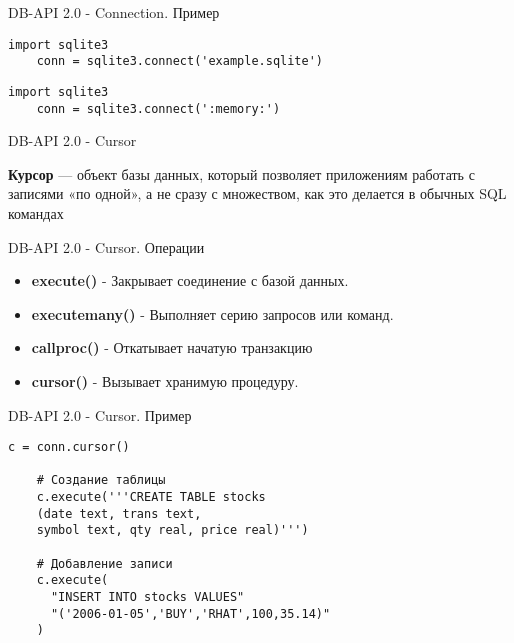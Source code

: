 \begin{frame}[fragile]{DB-API 2.0 - Connection. Пример}

    \begin{lstlisting}[style=python]
    import sqlite3
    conn = sqlite3.connect('example.sqlite')
    \end{lstlisting}

    \begin{lstlisting}[style=python]
    import sqlite3
    conn = sqlite3.connect(':memory:')
    \end{lstlisting}

\end{frame}

\begin{frame}{DB-API 2.0 - Cursor}

  \textbf{Курсор} — объект базы данных, который позволяет приложениям работать
  с записями «по одной», а не сразу с множеством, как это делается в обычных
  SQL командах

\end{frame}

\begin{frame}{DB-API 2.0 - Cursor. Операции}

  \begin{itemize}

    \item \textbf{execute()} - Закрывает соединение с базой данных.
    \item \textbf{executemany()} - Выполняет серию запросов или команд.
    \item \textbf{callproc()} - Откатывает начатую транзакцию
    \item \textbf{cursor()} - Вызывает хранимую процедуру.

  \end{itemize}

\end{frame}

\begin{frame}[fragile]{DB-API 2.0 - Cursor. Пример}

    \begin{lstlisting}[style=python]
    c = conn.cursor()

    # Создание таблицы
    c.execute('''CREATE TABLE stocks
    (date text, trans text,
    symbol text, qty real, price real)''')

    # Добавление записи
    c.execute(
      "INSERT INTO stocks VALUES"
      "('2006-01-05','BUY','RHAT',100,35.14)"
    )
    \end{lstlisting}

\end{frame}

